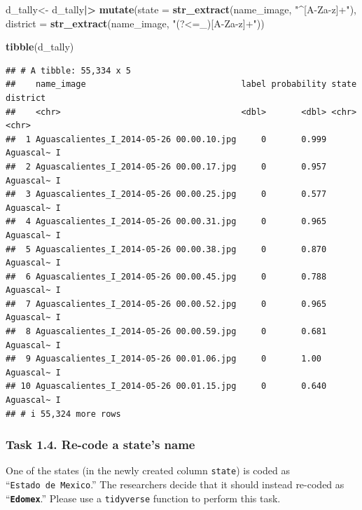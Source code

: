 \documentclass[
]{article}
\newenvironment{Shaded}{\begin{snugshade}}{\end{snugshade}}
\newcommand{\AttributeTok}[1]{\textcolor[rgb]{0.13,0.29,0.53}{#1}}
\newcommand{\FunctionTok}[1]{\textcolor[rgb]{0.13,0.29,0.53}{\textbf{#1}}}
\newcommand{\NormalTok}[1]{#1}
\newcommand{\OtherTok}[1]{\textcolor[rgb]{0.56,0.35,0.01}{#1}}
\newcommand{\SpecialCharTok}[1]{\textcolor[rgb]{0.81,0.36,0.00}{\textbf{#1}}}
\newcommand{\StringTok}[1]{\textcolor[rgb]{0.31,0.60,0.02}{#1}}
\begin{document}
\begin{Shaded}
\begin{Highlighting}[]
\NormalTok{ d\_tally}\OtherTok{\textless{}{-}}\NormalTok{ d\_tally}\SpecialCharTok{|\textgreater{}}
 \FunctionTok{mutate}\NormalTok{(}\AttributeTok{state =} \FunctionTok{str\_extract}\NormalTok{(name\_image, }\StringTok{"\^{}[A{-}Za{-}z]+"}\NormalTok{),}
         \AttributeTok{district =} \FunctionTok{str\_extract}\NormalTok{(name\_image, }\StringTok{"(?\textless{}=\_)[A{-}Za{-}z]+"}\NormalTok{))}
 
 \FunctionTok{tibble}\NormalTok{(d\_tally)}
\end{Highlighting}
\end{Shaded}

\begin{verbatim}
## # A tibble: 55,334 x 5
##    name_image                               label probability state     district
##    <chr>                                    <dbl>       <dbl> <chr>     <chr>   
##  1 Aguascalientes_I_2014-05-26 00.00.10.jpg     0       0.999 Aguascal~ I       
##  2 Aguascalientes_I_2014-05-26 00.00.17.jpg     0       0.957 Aguascal~ I       
##  3 Aguascalientes_I_2014-05-26 00.00.25.jpg     0       0.577 Aguascal~ I       
##  4 Aguascalientes_I_2014-05-26 00.00.31.jpg     0       0.965 Aguascal~ I       
##  5 Aguascalientes_I_2014-05-26 00.00.38.jpg     0       0.870 Aguascal~ I       
##  6 Aguascalientes_I_2014-05-26 00.00.45.jpg     0       0.788 Aguascal~ I       
##  7 Aguascalientes_I_2014-05-26 00.00.52.jpg     0       0.965 Aguascal~ I       
##  8 Aguascalientes_I_2014-05-26 00.00.59.jpg     0       0.681 Aguascal~ I       
##  9 Aguascalientes_I_2014-05-26 00.01.06.jpg     0       1.00  Aguascal~ I       
## 10 Aguascalientes_I_2014-05-26 00.01.15.jpg     0       0.640 Aguascal~ I       
## # i 55,324 more rows
\end{verbatim}

\clearpage

\hypertarget{task-1.4.-re-code-a-states-name}{%
\subsubsection{Task 1.4. Re-code a state's
name}\label{task-1.4.-re-code-a-states-name}}

One of the states (in the newly created column \texttt{state}) is coded
as ``\texttt{Estado\ de\ Mexico}.'' The researchers decide that it
should instead re-coded as ``\textbf{\texttt{Edomex}}.'' Please use a
\texttt{tidyverse} function to perform this task.
\end{document}
